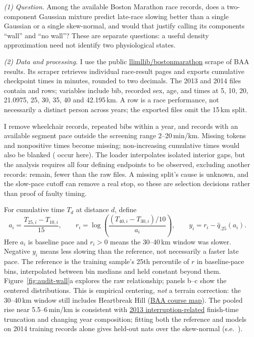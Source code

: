 \documentclass[12pt]{article}
\begin{document}
{\small
\setlength{\parskip}{0.55ex plus 0.1ex minus 0.1ex}

\textit{(1) Question.} Among the available Boston Marathon race records, does a
two-component Gaussian mixture predict late-race slowing better than a single
Gaussian or a single skew-normal, and would that justify calling its components
``wall'' and ``no wall''? These are separate questions: a useful density
approximation need not identify two physiological states.

\textit{(2) Data and processing.} I use the public
\href{https://github.com/llimllib/bostonmarathon}{\textnormal{llimllib/bostonmarathon}}
scrape of BAA results. Its scraper retrieves
individual race-result pages and exports cumulative checkpoint times in minutes,
rounded to two decimals. The 2013 and 2014 files contain \auditRawYearThirteen{} and \auditRawYearFourteen{} rows;
variables include bib, recorded sex, age, and times at 5, 10, 20, 21.0975, 25, 30,
35, 40 and 42.195\,km. A row is a race performance, not necessarily a distinct
person across years; the exported files omit the 15\,km split.

I remove \auditWheelchairN{} wheelchair records, \auditDuplicateN{} repeated bibs within a year, and \auditPaceExcludedN{} records
with an available segment pace outside the screening range 2--20\,min/km.
Missing tokens and nonpositive times become missing; non-increasing cumulative
times would also be blanked (\auditNonmonotoneN{} occur here). The loader interpolates isolated
interior gaps, but the analysis requires all four defining endpoints to be
observed, excluding another \auditEndpointExcludedN{} records: \auditN{} remain, \auditExcludedN{} fewer than the raw
files. A missing split's cause is unknown, and the slow-pace cutoff can remove a
real stop, so these are selection decisions rather than proof of faulty timing.

For cumulative time $T_d$ at distance $d$, define
\[
 a_i=\frac{T_{25,i}-T_{10,i}}{15},\qquad
 r_i=\log\!\left(\frac{(T_{40,i}-T_{30,i})/10}{a_i}\right),\qquad
 y_i=r_i-\widehat q_{.25}(a_i).
\]
Here $a_i$ is baseline pace and $r_i>0$ means the 30--40\,km window was slower.
Negative $y_i$ means less slowing than the reference, not necessarily a faster
late pace. The reference is the training sample's 25th percentile of $r$ in \auditReferenceBins{} baseline-pace
bins, interpolated between bin medians and held constant beyond them.
Figure~\ref{fig:audit-wall}a explores the raw relationship; panels b--c show the
centered distributions. This is empirical centering, \emph{not} a terrain
correction: the 30--40\,km window still includes Heartbreak Hill
(\href{https://www.baa.org/wp-content/uploads/docs/2025-03/129thBM_SpectatorGuide.pdf}{BAA course map}).
The pooled rise near 5.5--6\,min/km is consistent with
\href{https://journals.plos.org/plosone/article?id=10.1371/journal.pone.0093800}{2013 interruption-related}
finish-time truncation and changing year composition; fitting both the reference
and models on 2014 training records alone gives \auditGainYearFourteenSeparate{}
held-out nats over the skew-normal (s.e.\ \auditSeYearFourteenSeparate).

}
\end{document}
